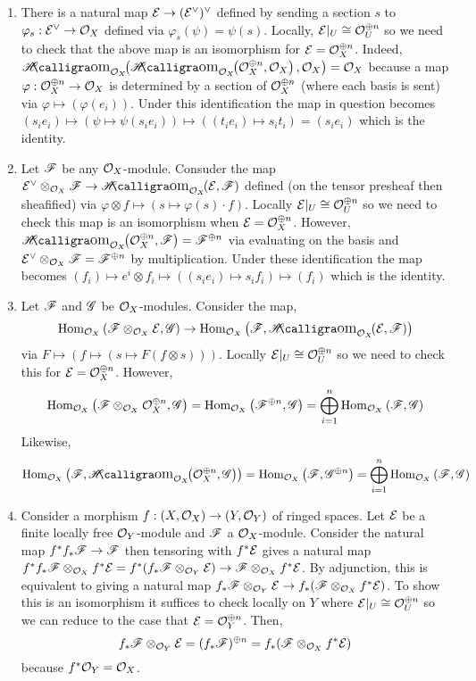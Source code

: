 \documentclass[12pt]{article}
\begin{document}
\begin{enumerate}
\item There is a natural map $\mathcal{E} \to (\mathcal{E}^\vee)^\vee$ defined by sending a section $s$ to $\varphi_s : \mathcal{E}^\vee \to \mathcal{O}_{X}$ defined via $\varphi_s(\psi) = \psi(s)$. Locally,  $\mathcal{E}|_U \cong \mathcal{O}_{U}^{\oplus n}$ so we need to check that the above map is an isomorphism for $\mathcal{E} = \mathcal{O}_{X}^{\oplus n}$. Indeed, $\shHom{\struct{X}}{\shHom{\struct{X}}{\struct{X}^{\oplus n}}{\struct{X}}}{\struct{X}} = \struct{X}$ because a map $\varphi : \mathcal{O}_{X}^{\oplus n} \to \mathcal{O}_{X}$ is determined by a section of $\mathcal{O}_{X}^{\oplus n}$ (where each basis is sent) via $\varphi \mapsto (\varphi(e_i))$. Under this identification the map in question becomes $(s_i e_i) \mapsto (\psi \mapsto \psi(s_i e_i)) \mapsto ((t_i e_i) \mapsto s_i t_i) = (s_i e_i)$ which is the identity. 

\item Let $\mathscr{F}$ be any $\mathcal{O}_{X}$-module. Consuder the map $\E^\vee \otimes_{\struct{X}} \F \to \shHom{\struct{X}}{\E}{\F}$ defined (on the tensor presheaf then sheafified) via $\varphi \otimes f \mapsto (s \mapsto \varphi(s) \cdot f)$. Locally $\mathcal{E}|_U \cong \mathcal{O}_{U}^{\oplus n}$ so we need to check this map is an isomorphism when $\mathcal{E} = \mathcal{O}_{X}^{\oplus n}$. However, $\shHom{\struct{X}}{\struct{X}^{\oplus n}}{\F} = \F^{\oplus n}$ via evaluating on the basis and $\mathcal{E}^\vee \otimes_{\mathcal{O}_{X}} \mathscr{F} = \mathscr{F}^{\oplus n}$ by multiplication. Under these identification the map becomes $(f_i) \mapsto e^i \otimes f_i \mapsto ((s_i e_i) \mapsto s_i f_i) \mapsto (f_i)$ which is the identity. 

\item Let $\mathscr{F}$ and $\mathscr{G}$ be $\mathcal{O}_{X}$-modules. Consider the map,
\[ \Hom{\struct{X}}{\F \otimes_{\struct{X}} \E}{\G} \to \Hom{\struct{X}}{\F}{\shHom{\struct{X}}{\E}{\F}} \]
via $F \mapsto (f \mapsto (s \mapsto F(f \otimes s)))$. Locally $\mathcal{E}|_U \cong \mathcal{O}_{U}^{\oplus n}$ so we need to check this for $\mathcal{E} = \mathcal{O}_{X}^{\oplus n}$. However,
\[ \mathrm{Hom}_{\mathcal{O}_{X}} \left( \mathscr{F} \otimes_{\mathcal{O}_{X}} \mathcal{O}_{X}^{\oplus n}, \mathscr{G} \right) = \mathrm{Hom}_{\mathcal{O}_{X}} \left( \mathscr{F}^{\oplus n}, \mathscr{G} \right) = \bigoplus_{i = 1}^n \mathrm{Hom}_{\mathcal{O}_{X}} \left( \mathscr{F}, \mathscr{G} \right) \]
Likewise,
\[ \Hom{\struct{X}}{\F}{\shHom{\struct{X}}{\struct{X}^{\oplus n}}{\G}} = \Hom{\struct{X}}{\F}{\G^{\oplus n}} = \bigoplus_{i = 1}^n \Hom{\struct{X}}{\F}{\G} \]

\item Consider a morphism $f : (X, \mathcal{O}_{X}) \to (Y, \mathcal{O}_{Y})$ of ringed spaces. Let $\mathcal{E}$ be a finite locally free $\mathcal{O}_{Y}$-module and $\mathscr{F}$ a $\mathcal{O}_{X}$-module. Consider the natural map $f^* f_* \mathscr{F} \to \mathscr{F}$ then tensoring with $f^* \mathcal{E}$ gives a natural map $f^* f_* \mathscr{F} \otimes_{\mathcal{O}_{X}} f^* \mathcal{E} = f^*(f_* \mathscr{F} \otimes_{\mathcal{O}_{Y}} \mathcal{E}) \to \mathscr{F} \otimes_{\mathcal{O}_{X}} f^* \mathcal{E}$. By adjunction, this is equivalent to giving a natural map $f_* \mathscr{F} \otimes_{\mathcal{O}_{Y}} \mathcal{E} \to f_*(\mathscr{F} \otimes_{\mathcal{O}_{X}} f^* \mathcal{E})$. To show this is an isomorphism it suffices to check locally on $Y$ where $\mathcal{E}|_U \cong \mathcal{O}_{U}^{\oplus n}$ so we can reduce to the case that $\mathcal{E} = \mathcal{O}_{Y}^{\oplus n}$. Then,
\[ f_* \mathscr{F} \otimes_{\mathcal{O}_{Y}} \mathcal{E} = (f_* \mathscr{F})^{\oplus n} = f_* (\mathscr{F} \otimes_{\mathcal{O}_{X}} f^* \mathcal{E}) \]
because $f^* \mathcal{O}_{Y} = \mathcal{O}_{X}$.
\end{enumerate}
\end{document}
